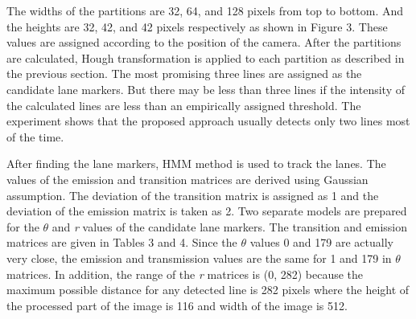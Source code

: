 \documentclass[a4paper,oneside,10pt]{article}
\begin{document}
The widths of the partitions are 32, 64, and 128 pixels from top to bottom. And the heights are 32, 42, and 42 pixels respectively as shown in Figure 3. These values are assigned according to the position of the camera. After the partitions are calculated, Hough transformation is applied to each partition as described in the previous section.  The most promising three lines are assigned as the candidate lane markers. But there may be less than three lines if the intensity of the calculated lines are less than an empirically assigned threshold. The experiment shows that the proposed approach usually detects only two lines most of the time.

After finding the lane markers, HMM method is used to track the lanes. The values of the emission and transition matrices are derived using Gaussian assumption. The deviation of the transition matrix is assigned as 1 and the deviation of the emission matrix is taken as 2. Two separate models are prepared for the \textit{$\theta $} and \textit{r} values of the candidate lane markers. The transition and emission matrices are given in Tables 3 and 4. Since the \textit{$\theta $} values 0 and 179 are actually very close, the emission and transmission values are the same for 1 and 179 in \textit{$\theta $} matrices. In addition, the range of the \textit{r} matrices is (0, 282) because the maximum possible distance for any detected line is 282 pixels where the height of the processed part of the image is 116 and width of the image is 512.
\end{document}
